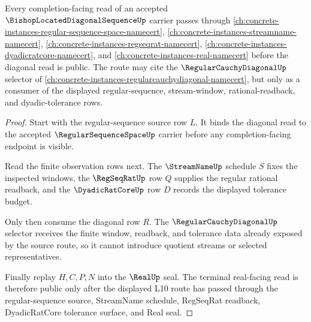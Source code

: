 \begin{theorem}
\label{thm:bishop-located-diagonal-sequence-l10-route}
Every completion-facing read of an accepted $\BishopLocatedDiagonalSequenceUp$ carrier passes through \autoref{ch:concrete-instances-regular-sequence-space-namecert}, \autoref{ch:concrete-instances-streamname-namecert}, \autoref{ch:concrete-instances-regseqrat-namecert}, \autoref{ch:concrete-instances-dyadicratcore-namecert}, and \autoref{ch:concrete-instances-real-namecert} before the diagonal read is public. The route may cite the $\RegularCauchyDiagonalUp$ selector of \autoref{ch:concrete-instances-regularcauchydiagonal-namecert}, but only as a consumer of the displayed regular-sequence, stream-window, rational-readback, and dyadic-tolerance rows.
\end{theorem}
\begin{proof}
Start with the regular-sequence source row $L$. It binds the diagonal read to the accepted $\RegularSequenceSpaceUp$ carrier before any completion-facing endpoint is visible.

Read the finite observation rows next. The $\StreamNameUp$ schedule $S$ fixes the inspected windows, the $\RegSeqRatUp$ row $Q$ supplies the regular rational readback, and the $\DyadicRatCoreUp$ row $D$ records the displayed tolerance budget.

Only then consume the diagonal row $R$. The $\RegularCauchyDiagonalUp$ selector receives the finite window, readback, and tolerance data already exposed by the source route, so it cannot introduce quotient streams or selected representatives.

Finally replay $H,C,P,N$ into the $\RealUp$ seal. The terminal real-facing read is therefore public only after the displayed L10 route has passed through the regular-sequence source, StreamName schedule, RegSeqRat readback, DyadicRatCore tolerance surface, and Real seal.
\end{proof}


\begin{closurestatus}{\BishopLocatedDiagonalSequenceUp}
  \theoryclosure{\seedClosure}
  \formalstatus{\unformalizedV}
\end{closurestatus}
